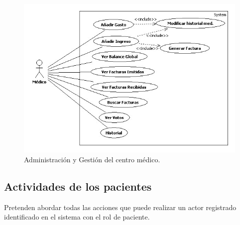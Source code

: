 \documentclass[a4paper,oneside,11pt]{book}
\begin{document}
				\begin{figure}[H]
				  \centering
				    \includegraphics[width=14cm]{img/jpg/casos_uso/Administracion_y_Gestion.jpg}
				  \caption{Administración y Gestión del centro médico.}
				  \label{fig:ad_ges_med}
				\end{figure}
					
	
		\subsection{Actividades de los pacientes} %
		\label{sec:actividades_de_los_pacientes}
		Pretenden abordar todas las acciones que puede realizar un actor registrado identificado en el sistema con el rol de paciente.
\end{document}
